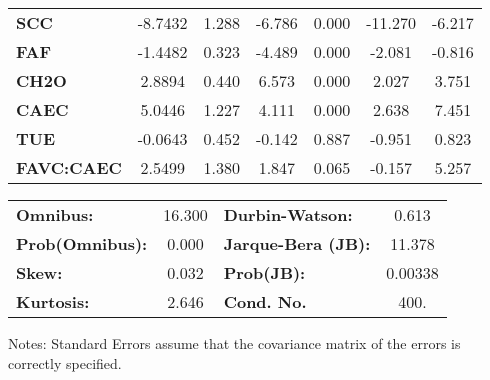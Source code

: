 \begin{center}
\begin{tabular}{lcccccc}
\textbf{SCC}       &      -8.7432  &        1.288     &    -6.786  &         0.000        &      -11.270    &       -6.217     \\
\textbf{FAF}       &      -1.4482  &        0.323     &    -4.489  &         0.000        &       -2.081    &       -0.816     \\
\textbf{CH2O}      &       2.8894  &        0.440     &     6.573  &         0.000        &        2.027    &        3.751     \\
\textbf{CAEC}      &       5.0446  &        1.227     &     4.111  &         0.000        &        2.638    &        7.451     \\
\textbf{TUE}       &      -0.0643  &        0.452     &    -0.142  &         0.887        &       -0.951    &        0.823     \\
\textbf{FAVC:CAEC} &       2.5499  &        1.380     &     1.847  &         0.065        &       -0.157    &        5.257     \\
\bottomrule
\end{tabular}
\begin{tabular}{lclc}
\textbf{Omnibus:}       & 16.300 & \textbf{  Durbin-Watson:     } &    0.613  \\
\textbf{Prob(Omnibus):} &  0.000 & \textbf{  Jarque-Bera (JB):  } &   11.378  \\
\textbf{Skew:}          &  0.032 & \textbf{  Prob(JB):          } &  0.00338  \\
\textbf{Kurtosis:}      &  2.646 & \textbf{  Cond. No.          } &     400.  \\
\bottomrule
\end{tabular}
\end{center}

Notes: \newline
 [1] Standard Errors assume that the covariance matrix of the errors is correctly specified.